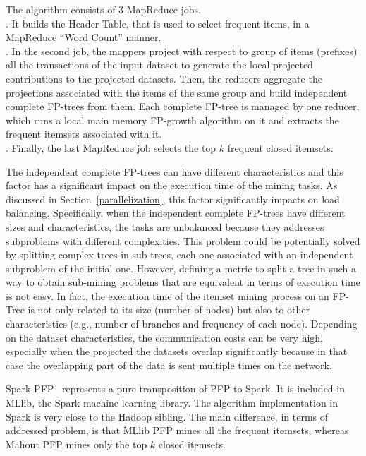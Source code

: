 \documentclass[preprint,review,12pt]{elsarticle}
\begin{document}
The algorithm consists of 3 MapReduce jobs.\\ 
. It builds the Header Table, that is used to select frequent items, in a MapReduce ``Word Count'' manner. \\
. In the second job, the mappers project with respect to group of items (prefixes) all the transactions of the input dataset to generate the local projected contributions to the projected datasets. Then, the reducers aggregate the projections associated with the items of the same group and build independent complete FP-trees from them. Each complete FP-tree is managed by one reducer, which runs a local main memory FP-growth algorithm on it and extracts the frequent itemsets associated with it.  \\
. Finally, the last MapReduce job selects the top $k$ frequent closed itemsets.

The independent complete FP-trees can have different characteristics and this factor has
a significant impact on the execution time of the mining tasks. As discussed in Section~\ref{parallelization},
this factor significantly impacts on load balancing. Specifically,   
when the independent complete FP-trees have different sizes and characteristics, the tasks are unbalanced because they addresses
subproblems with different complexities. This problem could be potentially solved by
splitting complex trees in sub-trees, each one associated with an independent subproblem of the initial one.
However, defining a metric to split a tree
in such a way to obtain sub-mining problems that are equivalent in terms of execution time is not easy. In fact, the execution 
time of the itemset mining process on an FP-Tree is not only related to its size (number of nodes) but also to other characteristics (e.g., number of branches
and frequency of each node). 
Depending on the dataset characteristics, the communication costs can be very high, especially when the projected the datasets overlap significantly
because in that case the overlapping part of the data is sent multiple times on the network.

Spark PFP~\cite{MLLib} represents a pure transposition of PFP to Spark. It
is included in MLlib, the Spark machine learning library. The algorithm
implementation in Spark is very close to the Hadoop sibling. The main difference, in terms of addressed problem, is that 
MLlib PFP mines all the frequent itemsets, whereas Mahout PFP mines only the top $k$ closed itemsets. 
\end{document}
